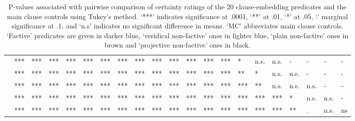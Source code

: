 \documentclass[11pt,fleqn]{article}
\newcommand{\6}{\mbox{$[\hspace*{-.6mm}[$}}
\newcommand{\9}{\mbox{$]\hspace*{-.6mm}]$}}
\begin{document}
\begin{table}[H]
\begin{tabular}{l l l l l l l l l l l l l l l l l l l l l }
\color{blue}{\em discover}\color{black}	& ***		& *** & *** & *** & *** & *** & *** & *** & *** & *** &  ***  &  ***  &  ***  & * & n.s. & n.s. & - & - & - & - \\
\color{black}{\em inform}\color{black}		&***		& *** & *** & *** & *** & *** & *** & *** & *** & *** & *** & *** &  ***  & ** & * & n.s. & n.s. & - & - & - \\
\color{blue}{\em see}\color{black}		&***		& *** & *** & *** & *** & *** & *** & *** & *** & *** & *** &  ***  &  ***  &  ***  & ** & n.s. & n.s. & n.s. & - & - \\
\color{blue}{\em know}\color{black}		&***		& *** & *** & *** & *** & *** & *** & *** & *** & *** & *** & *** & *** & *** & *** & *** & * & n.s. & n.s. & -  \\
\color{blue}{\em be annoyed}\color{black}	&***		& *** & *** & *** & *** & *** & *** & *** & *** & ***  & ***  & *** & *** & *** & *** & *** & ** & . & n.s. & ns  \\

\bottomrule
\end{tabular}
\caption{P-values associated with pairwise comparison of certainty ratings of the 20 clause-embedding predicates and the main clause controls using Tukey's method. `***' indicates significance at .0001, `**' at .01, `*' at .05, `.' marginal significance at .1, and `n.s' indicates no significant difference in means. `MC' abbreviates main clause controls. `Factive' predicates are given in darker blue, `veridical non-factive' ones in lighter blue, `plain non-factive' ones in brown and `projective non-factive' ones in black.}\label{t-pairwise-proj}
\end{table} 
\end{document}
